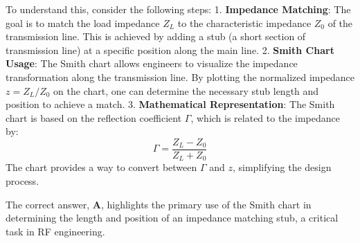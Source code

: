 To understand this, consider the following steps:
1. \textbf{Impedance Matching}: The goal is to match the load impedance \( Z_L \) to the characteristic impedance \( Z_0 \) of the transmission line. This is achieved by adding a stub (a short section of transmission line) at a specific position along the main line.
2. \textbf{Smith Chart Usage}: The Smith chart allows engineers to visualize the impedance transformation along the transmission line. By plotting the normalized impedance \( z = Z_L / Z_0 \) on the chart, one can determine the necessary stub length and position to achieve a match.
3. \textbf{Mathematical Representation}: The Smith chart is based on the reflection coefficient \( \Gamma \), which is related to the impedance by:
   \[
   \Gamma = \frac{Z_L - Z_0}{Z_L + Z_0}
   \]
   The chart provides a way to convert between \( \Gamma \) and \( z \), simplifying the design process.

The correct answer, \textbf{A}, highlights the primary use of the Smith chart in determining the length and position of an impedance matching stub, a critical task in RF engineering.

